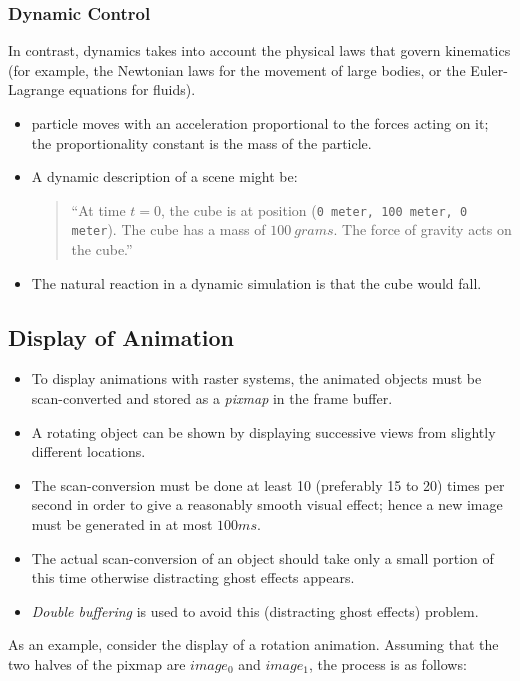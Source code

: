 \subsubsection*{Dynamic Control}
 In contrast, dynamics takes into account the physical laws that govern kinematics (for example, the Newtonian laws for the movement of large bodies, or the Euler-Lagrange equations for fluids). 
\begin{itemize}
	\item particle moves with an acceleration proportional to the forces acting on it; the proportionality constant is the mass of the particle. 
	\item A	dynamic description of a scene might be: 
	\begin{quotation}
			\noindent ``At time $ t=0 $, the cube is at position  (\texttt{0 \:meter, 100 \:meter, 0 \:meter}). The cube has a mass of $ 100 \:grams $. The force of gravity acts on the cube.''
	\end{quotation}
	\item The natural reaction in a dynamic simulation is that the cube would fall.
\end{itemize}


\subsection{Display of Animation}\label{sec:animation_display}
\begin{itemize}
	\item To display animations with raster systems, the animated objects must be scan-converted and stored as a \textit{pixmap} in the frame buffer. 
	\item A rotating object can be shown by displaying successive views from slightly different locations.
	\item The scan-conversion must be done at least 10 (preferably 15 to 20) times per second in order to give a reasonably smooth visual effect; hence a new image must be generated in at most $ 100ms $. 
	\item The actual scan-conversion of an object should take only a small portion of this time otherwise distracting ghost effects appears.
	\item \textit{Double buffering} is used to avoid this (distracting ghost effects) problem. 
\end{itemize}

As an example, consider the display of a rotation animation. Assuming that the two halves of the pixmap are $ image_0 $ and $ image_1 $, the process is as follows:

